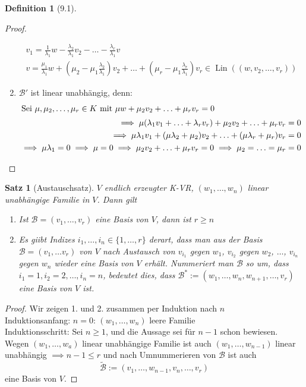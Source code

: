 \documentclass[a4paper]{scrartcl}
\DeclareMathOperator{\Lin}{Lin}
\theoremstyle{definition}
\newtheorem{defn}{Definition}
\theoremstyle{plain}
\newtheorem{thm}{Satz}
\theoremstyle{plain}
\theoremstyle{remark}
\theoremstyle{remark}
\theoremstyle{remark}
\theoremstyle{remark}
\theoremstyle{remark}
\begin{document}
\begin{defn}[9.1]
\begin{proof}
\begin{enumerate}
\begin{align*}
v_1 = \frac{1}{\lambda_1} w - \frac{\lambda_2}{\lambda_1} v_2 - \ldots - \frac{\lambda_r}{\lambda_1} v \\
v =\frac{\mu_1}{\lambda_1} w + (\mu_2 - \mu_1 \frac{\lambda_2}{\lambda_1}) v_2 + \ldots + (\mu_r - \mu_1 \frac{\lambda_r}{\lambda_1}) v_r \in \Lin ((w, v_2, \ldots, v_r))
\end{align*}
\item $\mathcal{B}'$ ist linear unabhängig, denn: \\
\begin{align*}
\intertext{Sei $\mu, \mu_2, \ldots, \mu_r \in K$ mit $\mu w + \mu_2 v_2 + \ldots + \mu_r v_r = 0$}
\implies \mu(\lambda_1 v_1 + \ldots + \lambda_r v_r) + \mu_2 v_2 + \ldots + \mu_r v_r = 0 \\
\implies \mu \lambda_1 v_1 + (\mu \lambda_2 + \mu_2) v_2 + \ldots + (\mu \lambda_r + \mu_r) v_r = 0 \\
\implies \mu \lambda_1 = 0 \implies \mu = 0 \implies \mu_2 v_2 + \ldots + \mu_r v_r = 0 \implies \mu_2 = \ldots = \mu_r = 0
\end{align*}
\end{enumerate}
\end{proof}
\begin{thm}[Austauschsatz]
$V$ endlich erzeugter K-VR, $(w_1, \ldots, w_n)$ linear unabhängige Familie in $V$. Dann gilt
\begin{enumerate}
\item Ist $\mathcal{B} = (v_1, \ldots, v_r)$ eine Basis von $V$, dann ist $r \geq n$
\item Es giibt Indizes $i_1, \ldots, i_n \in \{1, \ldots, r\}$ derart, dass man aus der Basis $\mathcal{B} = (v_1, \ldots v_r)$ von $V$ nach Austausch von $v_{i_1}$ gegen $w_1$, $v_{i_2}$ gegen $w_2$, $\ldots$, $v_{i_n}$ gegen $w_n$ wieder eine Basis von $V$ erhält.
Nummeriert man $\mathcal{B}$ so um, dass $i_1 = 1, i_2 = 2, \ldots, i_n = n$, bedeutet dies, dass $\mathcal{B}^\ast :=(w_1, \ldots, w_n, w_{n + 1}, \ldots, v_r)$ eine Basis von $V$ ist.
\end{enumerate}
\end{thm}
\begin{proof}
Wir zeigen 1. und 2. zusammen per Induktion nach $n$ \\
  Induktionsanfang: $n = 0$: $(w_1, \ldots, w_n)$ leere Familie \\
  Induktionsschritt: Sei $n \geq 1$, und die Aussage sei für $n - 1$ schon bewiesen. Wegen $(w_1, \ldots, w_a)$ linear unabhängige Familie ist auch $(w_1, \ldots, w_{n - 1})$ linear unabhängig $\implies n - 1 \leq r$ und nach Umnummerieren von $\mathcal{B}$ ist auch
\[\tilde{\mathcal{B}} := (v_1, \ldots, w_{n - 1}, v_n, \ldots, v_r)\]
eine Basis von $V$.


\end{proof}
\end{defn}
\end{document}
